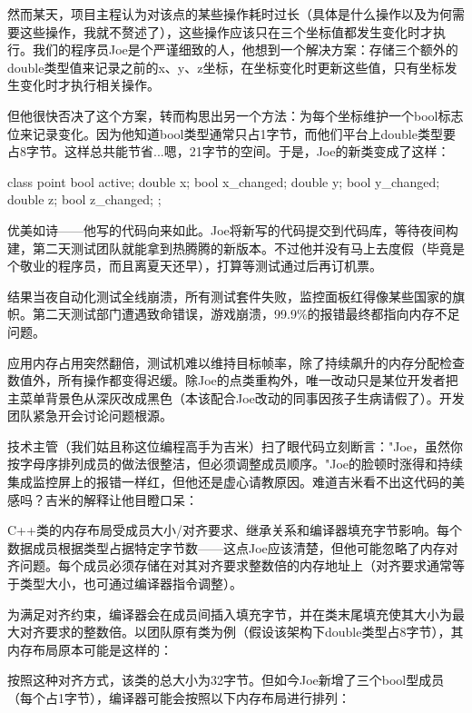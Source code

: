 然而某天，项目主程认为对该点的某些操作耗时过长（具体是什么操作以及为何需要这些操作，我就不赘述了），这些操作应该只在三个坐标值都发生变化时才执行。我们的程序员Joe是个严谨细致的人，他想到一个解决方案：存储三个额外的double类型值来记录之前的x、y、z坐标，在坐标变化时更新这些值，只有坐标发生变化时才执行相关操作。

但他很快否决了这个方案，转而构思出另一个方法：为每个坐标维护一个bool标志位来记录变化。因为他知道bool类型通常只占1字节，而他们平台上double类型要占8字节。这样总共能节省...嗯，21字节的空间。于是，Joe的新类变成了这样：

\begin{cpp}
class point {
  bool active;
  double x;
  bool x_changed;
  double y;
  bool y_changed;
  double z;
  bool z_changed;
};
\end{cpp}

优美如诗——他写的代码向来如此。Joe将新写的代码提交到代码库，等待夜间构建，第二天测试团队就能拿到热腾腾的新版本。不过他并没有马上去度假（毕竟是个敬业的程序员，而且离夏天还早），打算等测试通过后再订机票。

结果当夜自动化测试全线崩溃，所有测试套件失败，监控面板红得像某些国家的旗帜。第二天测试部门遭遇致命错误，游戏崩溃，99.9\%的报错最终都指向内存不足问题。

应用内存占用突然翻倍，测试机难以维持目标帧率，除了持续飙升的内存分配检查数值外，所有操作都变得迟缓。除Joe的点类重构外，唯一改动只是某位开发者把主菜单背景色从深灰改成黑色（本该配合Joe改动的同事因孩子生病请假了）。开发团队紧急开会讨论问题根源。

技术主管（我们姑且称这位编程高手为吉米）扫了眼代码立刻断言："Joe，虽然你按字母序排列成员的做法很整洁，但必须调整成员顺序。"Joe的脸顿时涨得和持续集成监控屏上的报错一样红，但他还是虚心请教原因。难道吉米看不出这代码的美感吗？吉米的解释让他目瞪口呆：

C++类的内存布局受成员大小/对齐要求、继承关系和编译器填充字节影响。每个数据成员根据类型占据特定字节数——这点Joe应该清楚，但他可能忽略了内存对齐问题。每个成员必须存储在对其对齐要求整数倍的内存地址上（对齐要求通常等于类型大小，也可通过编译器指令调整）。

为满足对齐约束，编译器会在成员间插入填充字节，并在类末尾填充使其大小为最大对齐要求的整数倍。以团队原有类为例（假设该架构下double类型占8字节），其内存布局原本可能是这样的：


按照这种对齐方式，该类的总大小为32字节。但如今Joe新增了三个bool型成员（每个占1字节），编译器可能会按照以下内存布局进行排列：

